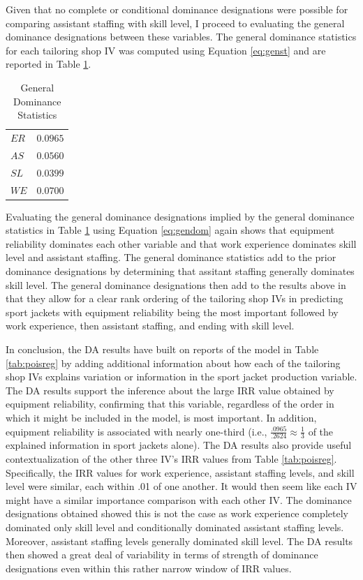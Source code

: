 \documentclass[man]{apa7}
\begin{document}
	Given that no complete or conditional dominance designations were possible for comparing assistant staffing with skill level, I proceed to evaluating the general dominance designations between these variables. 
	The general dominance statistics for each tailoring shop IV was computed using Equation \ref{eq:genst} and are reported in Table \ref{tab:gen}.
	
	\begin{table}[h!]
		\centering
		\caption{\centering General Dominance Statistics}
		\begin{tabular}{l|r}
			\hline %
			$ER$ & $0.0965$ \\ 
			$AS$ & $0.0560$ \\ 
			$SL$ & $0.0399$ \\ 
			$WE$ & $0.0700$ \\ 
			\hline %
		\end{tabular}
		\label{tab:gen}
	\end{table}

	Evaluating the general dominance designations implied by the general dominance statistics in Table \ref{tab:gen} using Equation \ref{eq:gendom} again shows that equipment reliability dominates each other variable and that work experience dominates skill level and assistant staffing. 
	The general dominance statistics add to the prior dominance designations by determining that assitant staffing generally dominates skill level.
	The general dominance designations then add to the results above in that they allow for a clear rank ordering of the tailoring shop IVs in predicting sport jackets with equipment reliability being the most important followed by work experience, then assistant staffing, and ending with skill level.
	
	In conclusion, the DA results have built on reports of the model in Table \ref{tab:poisreg} by adding additional information about how each of the tailoring shop IVs explains variation or information in the sport jacket production variable. 
	The DA results support the inference about the large IRR value obtained by equipment reliability, confirming that this variable, regardless of the order in which it might be included in the model, is most important. 
	In addition, equipment reliability is associated with nearly one-third (i.e., $\frac{.0965}{.2624} \approx \frac{1}{3}$ of the explained information in sport jackets alone).
	The DA results also provide useful contextualization of the other three IV's IRR values from Table \ref{tab:poisreg}.
	Specifically, the IRR values for work experience, assistant staffing levels, and skill level were similar, each within .01 of one another. 
	It would then seem like each IV might have a similar importance comparison with each other IV.
	The dominance designations obtained showed this is not the case as work experience completely dominated only skill level and conditionally dominated assistant staffing levels. 
	Moreover, assistant staffing levels generally dominated skill level.
	The DA results then showed a great deal of variability in terms of strength of dominance designations even within this rather narrow window of IRR values.
	
\end{document}
